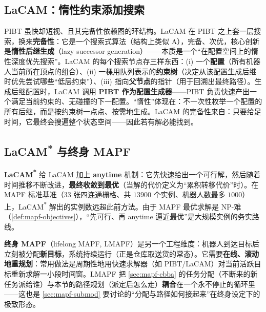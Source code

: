 \subsection{LaCAM：惰性约束添加搜索}
\label{sec:mapf-lacam}

PIBT 虽快却短视、且其完备性依赖图的环结构。LaCAM\cite{okumura2023lacam} 在 PIBT 之上套一层搜索，换来\textbf{完备性}：它是一个搜索式算法（结构上类似 A\*），完备、次优，核心创新是\textbf{惰性后继生成}（lazy successor generation）——本质是一个“在配置空间上的惰性深度优先搜索”。LaCAM 的每个搜索节点存三样东西：(i) 一个\textbf{配置}（所有机器人当前所在顶点的组合）、(ii) 一棵用队列表示的\textbf{约束树}（决定从该配置生成后继时优先尝试哪些“低层约束”）、(iii) 指向\textbf{父节点}的指针（用于回溯出最终路径）。生成后继配置时，LaCAM 调用 \textbf{PIBT 作为配置生成器}——PIBT 负责快速产出一个满足当前约束的、无碰撞的下一配置。“惰性”体现在：不一次性枚举一个配置的所有后继，而是按约束树一点点、按需地生成。LaCAM 的完备性来自：只要给足时间，它最终会搜遍整个状态空间——因此若有解必能找到。

\subsection{LaCAM\textsuperscript{*} 与终身 MAPF}
\label{sec:mapf-lacam-star}

\textbf{LaCAM\textsuperscript{*}}\cite{okumura2023lacamstar} 给 LaCAM 加上 \textbf{anytime} 机制：它先快速给出一个可行解，然后随着时间推移不断改进，\textbf{最终收敛到最优}（当解的代价定义为“累积转移代价”时）。在 MAPF 标准基准（$33$ 张四连通栅格、共 $13900$ 个实例、机器人数最多 $1000$）上，LaCAM\textsuperscript{*} 解出的实例数远超此前方法。由于 MAPF 最优求解是 NP-难（\cref{def:mapf-objectives}），“先可行、再 anytime 逼近最优”是大规模实例的务实路线。

\textbf{终身 MAPF}（lifelong MAPF, LMAPF）是另一个工程维度：机器人到达目标后立刻被分配\textbf{新目标}，系统持续运行（正是仓库取送货的常态）。它需要\textbf{在线、滚动地重规划}：常用做法是周期性地用快速求解器（如 PIBT/LaCAM）对当前活跃目标重新求解一小段时间窗。LMAPF 把 \cref{sec:mapf-cbba} 的任务分配（不断来的新任务派给谁）与本节的路径规划（派定后怎么走）\textbf{耦合}在一个永不停止的循环里——这也是 \cref{sec:mapf-submod} 要讨论的“分配与路径如何接起来”在终身设定下的极致形态。

